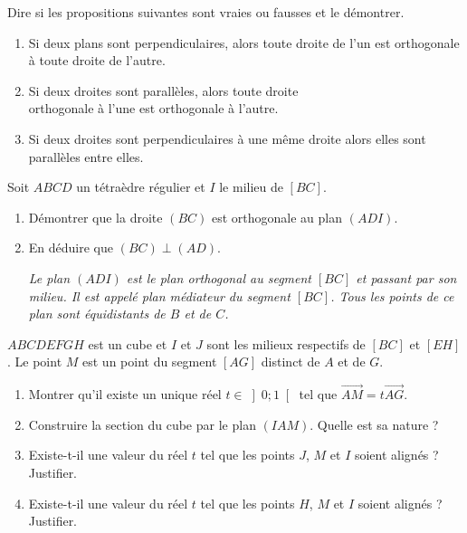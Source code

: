 \begin{colonne*exercice}

  \begin{exercice}
    Dire si les propositions suivantes sont vraies ou fausses et le
    démontrer.
    \begin{enumerate}
    \item Si deux plans sont perpendiculaires, alors toute droite de
      l'un est orthogonale à toute droite de l'autre.
    \item Si deux droites sont parallèles, alors toute droite\\
      orthogonale à l'une est orthogonale à l'autre.
    \item Si deux droites sont perpendiculaires à une même droite
      alors elles sont parallèles entre elles.
    \end{enumerate}
  \end{exercice}

  \begin{exercice}
    Soit $ABCD$ un tétraèdre régulier et $I$ le milieu de $[BC]$.

    \begin{center}
      
    \end{center}

    \begin{enumerate}
    \item Démontrer que la droite $(BC)$ est orthogonale au plan
      $(ADI)$.
    \item En déduire que $(BC)\perp(AD)$.

      \textit{Le plan $(ADI)$ est le plan orthogonal au segment $[BC]$
        et passant par son milieu. Il est appelé plan médiateur du
        segment $[BC]$. Tous les points de ce plan sont équidistants
        de $B$ et de $C$.}
    \end{enumerate}
  \end{exercice}

  \begin{exercice}
    $ABCDEFGH$ est un cube et $I$ et $J$ sont les milieux respectifs de
    $[BC]$ et $[EH]$.  Le point $M$ est un point du segment $[AG]$
    distinct de $A$ et de $G$.
    \begin{enumerate}
    \item Montrer qu'il existe un unique réel $t\in\left] 0;1\right[ $
      tel que $\overrightarrow{AM}=t\overrightarrow{AG}$.
    \item Construire la section du cube par le plan $(IAM)$. Quelle
      est sa nature ?
    \item Existe-t-il une valeur du réel $t$ tel que les points $J$,
      $M$ et $I$ soient alignés ? Justifier.
    \item Existe-t-il une valeur du réel $t$ tel que les points $H$,
      $M$ et $I$ soient alignés ? Justifier.
    \end{enumerate}
  \end{exercice}


\end{colonne*exercice}
